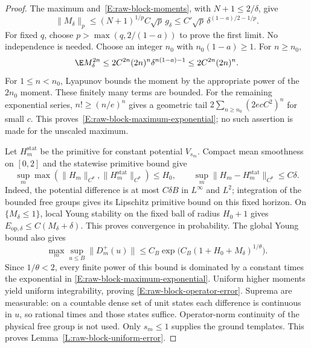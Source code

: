 \begin{proof}
  The maximum and~\eqref{E:raw-block-moments}, with $N+1\le2/\delta$,
  give
  \[
    \|M_\delta\|_p
    \le (N+1)^{1/p}C\sqrt p\,g_\delta
    \le C'\sqrt p\,\delta^{(1-a)/2-1/p}.
  \]
  For fixed $q$, choose $p>\max(q,2/(1-a))$ to prove the first limit.
  No independence is needed. Choose an integer $n_0$ with
  $n_0(1-a)\ge1$. For $n\ge n_0$,
  \[
    \E M_\delta^{2n}
    \le2C^{2n}(2n)^n\delta^{n(1-a)-1}
    \le2C^{2n}(2n)^n.
  \]
  For $1\le n<n_0$, Lyapunov bounds the moment by the appropriate
  power of the $2n_0$ moment. These finitely many terms are bounded.
  For the remaining exponential series, $n!\ge(n/e)^n$ gives
  a geometric tail $2\sum_{n\ge n_0}(2ecC^2)^n$ for small $c$.
  This proves~\eqref{E:raw-block-maximum-exponential}; no such
  assertion is made for the unscaled maximum.

  Let $H_m^{\mathrm{stat}}$ be the primitive for constant potential
  $V_{s_m}$. Compact mean smoothness on $[0,2]$ and the statewise
  primitive bound give
  \[
    \sup_m\max(\|H_m\|_{C^\theta},
    \|H_m^{\mathrm{stat}}\|_{C^\theta})\le H_0,\qquad
    \sup_m\|H_m-H_m^{\mathrm{stat}}\|_{C^\theta}\le C\delta.
  \]
  Indeed, the potential difference is at most $C\delta B$ in
  $L^\infty$ and $L^2$; integration of the bounded free groups
  gives its Lipschitz primitive bound on this fixed horizon.
  On $\{M_\delta\le1\}$, local Young stability on the fixed ball
  of radius $H_0+1$ gives
  $E_{\mathrm{op},\delta}\le C(M_\delta+\delta)$.
  This proves convergence in probability. The global Young bound
  also gives
  \[
    \max_m\sup_{u\le B}\|D_m^+(u)\|
    \le C_B\exp\big(C_B(1+H_0+M_\delta)^{1/\theta}\big).
  \]
  Since $1/\theta<2$, every finite power of this bound is dominated
  by a constant times the exponential in
  \eqref{E:raw-block-maximum-exponential}.
  Uniform higher moments yield uniform integrability, proving
  \eqref{E:raw-block-operator-error}. Suprema are measurable:
  on a countable dense set of unit states each difference is
  continuous in $u$, so rational times and those states suffice.
  Operator-norm continuity of the physical free group is not used.
  Only $s_m\le1$ supplies the ground templates.
  This proves Lemma~\ref{L:raw-block-uniform-error}.
\end{proof}

